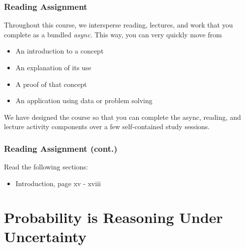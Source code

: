 \documentclass[12pt, block=fill]{beamer}
\begin{document}
\begin{frame}
  \frametitle{Reading Assignment}
  Throughout this course, we intersperse reading, lectures, and work
  that you complete as a bundled \textit{async}. This way, you can
  very quickly move from 
  \begin{itemize}
  \item An introduction to a concept
  \item An explanation of its use
  \item A proof of that concept 
  \item An application using data or problem solving
  \end{itemize}
  We have designed the course so that you can complete the async,
  reading, and lecture activity components over a few self-contained
  study sessions.
\end{frame}

\begin{frame}
  \frametitle{Reading Assignment (cont.)}
  Read the following sections:

  \begin{itemize}
  \item Introduction, page xv - xviii
  \end{itemize}
\end{frame}

\section{Probability is Reasoning Under Uncertainty}
\end{document}
